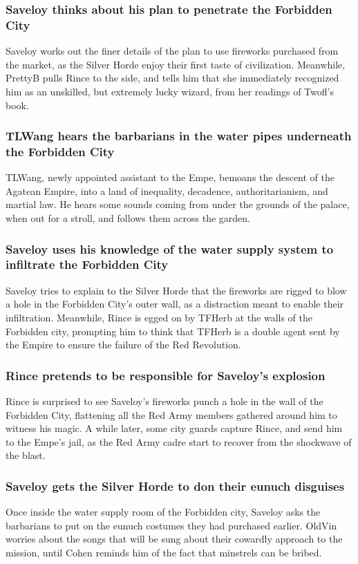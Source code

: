 \subsubsection{\Gls{Saveloy} thinks about his plan to penetrate the Forbidden City}
\Gls{Saveloy} works out the finer details of the plan to use fireworks purchased from the market,
as the Silver Horde enjoy their first taste of civilization. Meanwhile, \Gls{PrettyB} pulls
\Gls{Rince} to the side, and tells him that she immediately recognized him as an unskilled, but
extremely lucky wizard, from her readings of \Gls{Twofl}'s book.

\subsubsection{\Gls{TLWang} hears the barbarians in the water pipes underneath the Forbidden City}
\Gls{TLWang}, newly appointed assistant to the \Gls{Empe}, bemoans the descent of the Agatean
Empire, into a land of inequality, decadence, authoritarianism, and martial law. He hears some
sounds coming from under the grounds of the palace, when out for a stroll, and follows them across
the garden.

\subsubsection{\Gls{Saveloy} uses his knowledge of the water supply system to infiltrate the
    Forbidden City}
\Gls{Saveloy} tries to explain to the Silver Horde that the fireworks are rigged to blow a hole in
the Forbidden City's outer wall, as a distraction meant to enable their infiltration. Meanwhile,
\Gls{Rince} is egged on by \Gls{TFHerb} at the walls of the Forbidden city, prompting him to think
that \Gls{TFHerb} is a double agent sent by the Empire to ensure the failure of the Red Revolution.

\subsubsection{\Gls{Rince} pretends to be responsible for \Gls{Saveloy}'s explosion}
\Gls{Rince} is surprised to see \Gls{Saveloy}'s fireworks punch a hole in the wall of the Forbidden
City, flattening all the Red Army members gathered around him to witness his magic. A while later,
some city guards capture \Gls{Rince}, and send him to the \Gls{Empe}'s jail, as the Red Army
cadre start to recover from the shockwave of the blast.

\subsubsection{\Gls{Saveloy} gets the Silver Horde to don their eunuch disguises}
Once inside the water supply room of the Forbidden city, \Gls{Saveloy} asks the barbarians to put
on the eunuch costumes they had purchased earlier. \Gls{OldVin} worries about the songs that will
be sung about their cowardly approach to the mission, until \Gls{Cohen} reminds him of the fact
that minstrels can be bribed.

